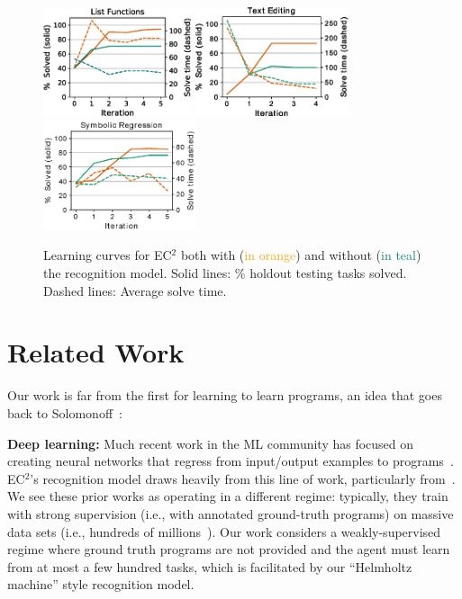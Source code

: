 \documentclass{article}
\newcommand{\system}{\textsc{EC$^2$} }
\newcommand{\systemEnding}{\textsc{EC$^2$}}
\newcommand{\orange}[1]{\textcolor{orange}{#1}}
\newcommand{\teal}[1]{\textcolor{teal}{#1}}
\begin{document}
\begin{figure}[h]\centering
  \includegraphics[width = 4.35cm]{figures/listLearningCurve_color.eps}
  \includegraphics[width = 4.5cm]{figures/textLearningCurve.eps}
  \includegraphics[width = 4.5cm]{figures/rationalCurve.eps}
  \caption{Learning curves for \system both with (\orange{in orange}) and without
  (\teal{in teal}) the recognition model. Solid lines: \% holdout testing tasks solved. Dashed lines: Average solve time.}\label{learningCurves}
\end{figure}

\section{Related Work}
 Our work is far from the first for learning to learn programs,
 an idea that goes back to Solomonoff~\cite{solomonoff1989system}:

 \noindent \textbf{Deep learning:} Much recent work in the ML community has
 focused on creating neural networks that regress from
 input/output examples to programs~\cite{devlin2017robustfill,devlin2017neural,menon2013machine,balog2016deepcoder}. %
\systemEnding's recognition model draws heavily from this line of work, particularly from~\cite{menon2013machine}.
We see these prior works as operating in a different regime: typically, they train with strong supervision (i.e., with annotated ground-truth programs) on massive data sets (i.e., hundreds of millions~\cite{devlin2017robustfill}).
 Our work   considers a weakly-supervised regime where ground truth programs are not provided and
 the agent must learn from at most a few hundred tasks,
 which is facilitated by our ``Helmholtz machine'' style recognition model.%
 
\end{document}
